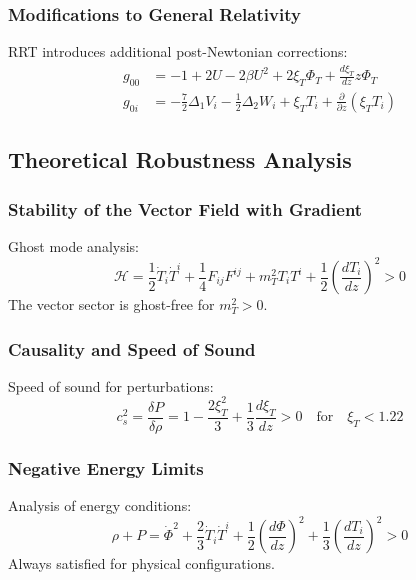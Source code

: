 \documentclass[12pt,a4paper]{article}
\begin{document}
\subsubsection{Modifications to General Relativity}
RRT introduces additional post-Newtonian corrections:
\begin{align}
    g_{00} &= -1 + 2U - 2\beta U^2 + 2\xi_T \Phi_T + \frac{d\xi_T}{dz} z \Phi_T \\
    g_{0i} &= -\frac{7}{2} \Delta_1 V_i - \frac{1}{2} \Delta_2 W_i + \xi_T T_i + \frac{\partial}{\partial z}(\xi_T T_i)
\end{align}

\subsection{Theoretical Robustness Analysis}

\subsubsection{Stability of the Vector Field with Gradient}
Ghost mode analysis:
\begin{equation}
    \mathcal{H} = \frac{1}{2} \dot{T}_i \dot{T}^i + \frac{1}{4} F_{ij} F^{ij} + m_T^2 T_i T^i + \frac{1}{2} \left( \frac{dT_i}{dz} \right)^2 > 0
\end{equation}
The vector sector is ghost-free for $m_T^2 > 0$.

\subsubsection{Causality and Speed of Sound}
Speed of sound for perturbations:
\begin{equation}
    c_s^2 = \frac{\delta P}{\delta \rho} = 1 - \frac{2\xi_T^2}{3} + \frac{1}{3} \frac{d\xi_T}{dz} > 0 \quad \text{for} \quad \xi_T < 1.22
\end{equation}

\subsubsection{Negative Energy Limits}
Analysis of energy conditions:
\begin{equation}
    \rho + P = \dot{\Phi}^2 + \frac{2}{3} \dot{T}_i \dot{T}^i + \frac{1}{2} \left( \frac{d\Phi}{dz} \right)^2 + \frac{1}{3} \left( \frac{dT_i}{dz} \right)^2 > 0
\end{equation}
Always satisfied for physical configurations.
\end{document}
